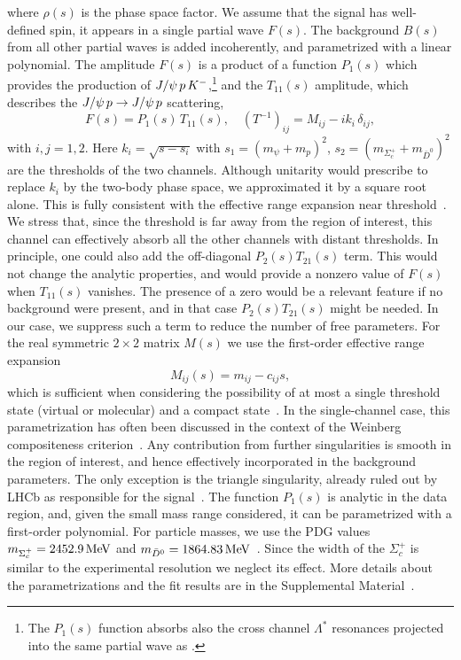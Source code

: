 \documentclass[aps,prl,
twocolumn,nofootinbib,
superscriptaddress,preprintnumbers]{revtex4-1}
\begin{document}
where $\rho(s)$ is the phase space factor. We assume that the \Pc signal has well-defined spin, \ie it appears in a single partial wave $F(s)$. The background $B(s)$ from all other partial waves is added incoherently, and parametrized with a linear polynomial.  
The amplitude $F(s)$ is a product of a 
  function $P_1(s)$ which provides
the production of $J/\psi\,p\,K^-$,\footnote{The $P_1(s)$ function absorbs also the cross channel $\Lambda^*$ resonances projected into the same partial wave as \Pc. } and the $T_{11}(s)$ amplitude, which describes 
   the  $J/\psi\,p\to J/\psi\,p$ scattering,
\begin{equation} 
F(s) = P_1(s)\, T_{11} (s),\quad \left(T^{-1}\right)_{ij} = M_{ij} - i k_i \,\delta_{ij}, \label{eq:caseAB}
\end{equation} 
with $i,j =1,2$. Here  $k_i = \sqrt{s - s_i}$ with  $s_1 = (m_{\psi} + m_{p})^2$, $s_2 = (m_{\Sigma^+_c} + m_{\bar{D}^0})^2$ are the thresholds of the two channels. 
Although unitarity would prescribe to replace $k_i$ by the two-body phase space,
we approximated it by a 
 square root alone. This 
is fully consistent with the effective range expansion near threshold~\cite{Frazer:1964zz,Fernandez-Ramirez:2015tfa,Pilloni:2016obd}. We  stress that, since the \jpsip threshold is far away from the region of interest, this channel can effectively absorb all the other channels with distant thresholds.
In principle, one could also add the off-diagonal $P_2(s) T_{21}(s)$ term. This would not change the analytic properties, and would provide a nonzero value of $F(s)$ when $T_{11}(s)$ vanishes. The presence of a zero would be a relevant feature if no background were present, and in that case  $P_2(s) T_{21}(s)$ might be needed. 
In our case, we suppress such a term to reduce the number of free parameters.
For the real  symmetric  $2\times 2$ matrix $M(s)$ we use the first-order  effective range expansion 
\begin{equation} 
M_{ij}(s) = m_{ij}  - c_{ij} s, \label{eq:m}
\end{equation} 
 which is sufficient when considering the possibility of at most a single 
   threshold state (virtual or molecular)
   and a compact state~\cite{Frazer:1964zz}. In the single-channel case, this parametrization has often been discussed in the context of the Weinberg compositeness criterion~\cite{Weinberg:1965zz,Aceti:2012dd,Sekihara:2014kya,Guo:2015daa,Baru:2003qq,Guo:2019kdc}.
Any contribution from further singularities is smooth in the region of interest, and hence 
effectively incorporated in the background parameters.
The only exception is the triangle singularity,
already ruled out by LHCb as responsible for the signal~\cite{Aaij:2019vzc}.
  The function $P_1(s)$ is analytic in the data region, and, given the small mass range considered, it can 
  be parametrized with a first-order polynomial. For particle masses, we use the PDG values $m_{\Sigma_c^+}=2452.9{\mathrm{\,Me\kern -0.1em V}}$ and $m_{\bar{D}^0}=1864.83{\mathrm{\,Me\kern -0.1em V}}$~\cite{pdg}.
  Since the width of the $\Sigma_c^+$ is similar to the experimental resolution we neglect its effect.
  More details about the parametrizations and the fit results are in the Supplemental Material~\cite{pcjpaclink}.
\end{document}

